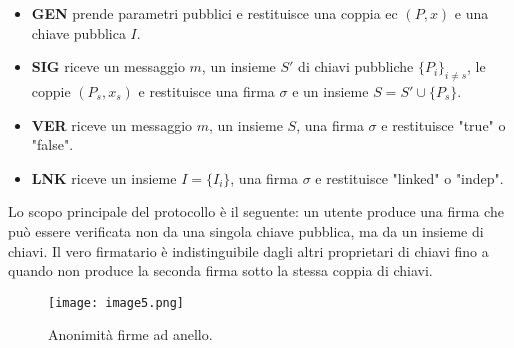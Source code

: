 \begin{itemize}
  \item
    \textbf{GEN} prende parametri pubblici e restituisce una coppia ec
    \emph{$(P, x)$} e una chiave pubblica $I$.
  \item
    \textbf{SIG} riceve un messaggio $m$, un insieme $S'$ di chiavi pubbliche
    $\{P_i\}_{i \neq s}$, le coppie \emph{$(P_s, x_s)$} e restituisce una firma $\sigma$ e un
    insieme $S = S' \cup \{P_s\}$.
  \item
    \textbf{VER} riceve un messaggio $m$, un insieme $S$, una firma $\sigma$ e
    restituisce "true" o "false".
  \item
    \textbf{LNK} riceve un insieme $I = \{I_i\}$, una firma $\sigma$ e restituisce
    "linked" o "indep".
\end{itemize}

Lo scopo principale del protocollo è il seguente: un utente produce una
firma che può essere verificata non da una singola chiave pubblica, ma
da un insieme di chiavi. Il vero firmatario è indistinguibile dagli
altri proprietari di chiavi fino a quando non produce la seconda firma
sotto la stessa coppia di chiavi.

\begin{figure}[h]
  \centering
  \texttt{[image: image5.png]}
  \caption{Anonimità firme ad anello.}
\end{figure}

